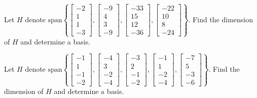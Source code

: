 \documentclass{ximera}
\begin{document}
\begin{problem}\label{prb:5.3} Let $H$ denote $\mbox{span}\left\{ \left[
\begin{array}{r}
-2 \\
1 \\
1 \\
-3
\end{array}
\right] ,\left[
\begin{array}{r}
-9 \\
4 \\
3 \\
-9
\end{array}
\right] ,\left[
\begin{array}{r}
-33 \\
15 \\
12 \\
-36
\end{array}
\right] ,\left[
\begin{array}{r}
-22 \\
10 \\
8 \\
-24
\end{array}
\right] \right\} .$ Find the dimension of $H$ and determine a basis.
\end{problem}

\begin{problem}\label{prb:5.4} Let $H$ denote $\mbox{span}\left\{ \left[
\begin{array}{r}
-1 \\
1 \\
-1 \\
-2
\end{array}
\right] ,\left[
\begin{array}{r}
-4 \\
3 \\
-2 \\
-4
\end{array}
\right] ,\left[
\begin{array}{r}
-3 \\
2 \\
-1 \\
-2
\end{array}
\right] ,\left[
\begin{array}{r}
-1 \\
1 \\
-2 \\
-4
\end{array}
\right] ,\left[
\begin{array}{r}
-7 \\
5 \\
-3 \\
-6
\end{array}
\right] \right\} .$ Find the dimension of $H$ and determine a basis. \vspace{%
1mm}
\end{problem}
\end{document}
